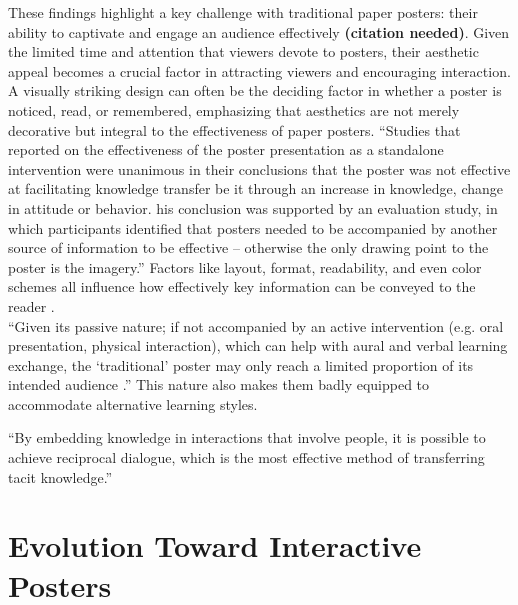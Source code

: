 These findings highlight a key challenge with traditional paper posters: their ability to captivate and engage an audience effectively \textbf{(citation needed)}. Given the limited time and attention that viewers devote to posters, their aesthetic appeal becomes a crucial factor in attracting viewers and encouraging interaction\cite{goodhand}. A visually striking design can often be the deciding factor in whether a poster is noticed, read, or remembered, emphasizing that aesthetics are not merely decorative but integral to the effectiveness of paper posters\cite{Erren, Arslan, Mabrouk}.
\enquote{Studies that reported on the effectiveness of the poster presentation as a standalone intervention were unanimous in their conclusions that the poster was not effective at facilitating knowledge transfer be it through an increase in knowledge, change in attitude or behavior. his conclusion was supported by an evaluation study, in which participants identified that posters needed to be accompanied by another source of information to be effective – otherwise the only drawing point to the poster is the imagery.} \cite{IlicRowe1} 
Factors like layout, format, readability, and even color schemes all influence how effectively key information can be conveyed to the reader \cite{IlicRowe1, Erren}.\\

\enquote{Given its passive nature; if not accompanied by an active intervention (e.g. oral presentation, physical interaction), which can help with aural and verbal learning exchange, the ‘traditional’ poster may only reach a limited proportion of its intended audience .} \cite{IlicRowe1}
This nature also makes them badly equipped to accommodate alternative learning styles.\cite{IlicRowe4} 

\enquote{By embedding knowledge in interactions that involve people, it is possible to achieve reciprocal dialogue, which is the most effective method of transferring tacit knowledge.} \cite{IlicRowe1}

\section{Evolution Toward Interactive Posters}
